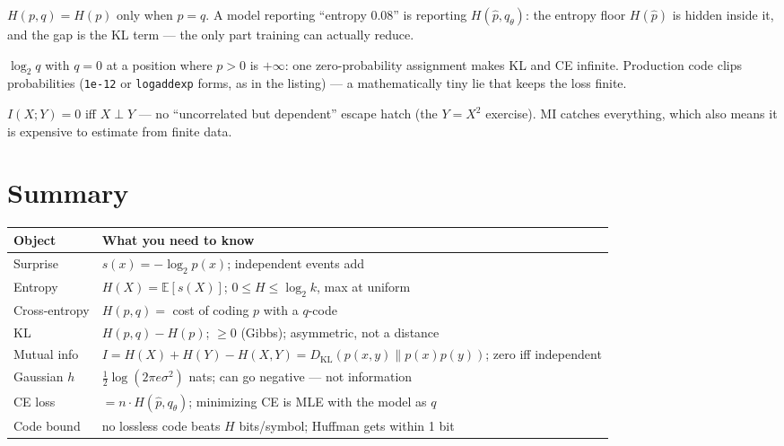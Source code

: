 \begin{tripwire}
$H(p,q)=H(p)$ only when $p=q$. A model reporting ``entropy $0.08$'' is
reporting $H(\hat p, q_\theta)$: the entropy floor $H(\hat p)$ is
hidden inside it, and the gap is the KL term --- the only part
training can actually reduce.
\end{tripwire}

\begin{tripwire}
$\log_2 q$ with $q=0$ at a position where $p>0$ is $+\infty$: one
zero-probability assignment makes KL and CE infinite. Production code
clips probabilities (\texttt{1e-12} or \texttt{logaddexp} forms, as in
the listing) --- a mathematically tiny lie that keeps the loss finite.
\end{tripwire}

\begin{tripwire}
$I(X;Y)=0$ iff $X\perp Y$ --- no ``uncorrelated but dependent''
escape hatch (the $Y=X^2$ exercise). MI catches everything, which also
means it is expensive to estimate from finite data.
\end{tripwire}

\section{Summary}

\begin{center}
\begin{tabularx}{\textwidth}{l>{\raggedright\arraybackslash}X}
\toprule
\textbf{Object} & \textbf{What you need to know}\\
\midrule
Surprise & $s(x)=-\log_2 p(x)$; independent events add \\
Entropy & $H(X)=\mathbb E[s(X)]$; $0\le H\le\log_2 k$, max at uniform \\
Cross-entropy & $H(p,q)=$ cost of coding $p$ with a $q$-code \\
KL & $H(p,q)-H(p)$; $\ge0$ (Gibbs); asymmetric, not a distance \\
Mutual info & $I=H(X)+H(Y)-H(X,Y)=D_{\mathrm{KL}}(p(x,y)\|p(x)p(y))$;
zero iff independent \\
Gaussian $h$ & $\tfrac12\log(2\pi e\sigma^2)$ nats; can go negative ---
not information \\
CE loss & $=n\cdot H(\hat p,q_\theta)$; minimizing CE is MLE with the
model as $q$ \\
Code bound & no lossless code beats $H$ bits/symbol; Huffman gets
within 1 bit \\
\bottomrule
\end{tabularx}
\end{center}

